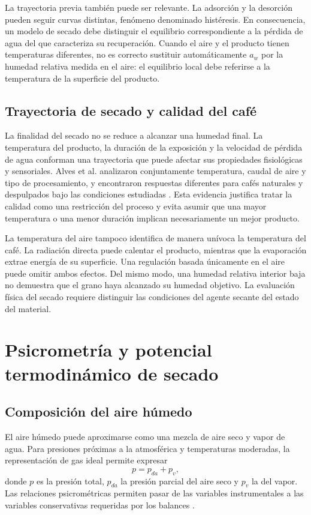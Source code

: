 La trayectoria previa también puede ser relevante. La adsorción y la desorción pueden seguir curvas distintas, fenómeno denominado histéresis. En consecuencia, un modelo de secado debe distinguir el equilibrio correspondiente a la pérdida de agua del que caracteriza su recuperación. Cuando el aire y el producto tienen temperaturas diferentes, no es correcto sustituir automáticamente $a_w$ por la humedad relativa medida en el aire: el equilibrio local debe referirse a la temperatura de la superficie del producto.

\subsection{Trayectoria de secado y calidad del café}

La finalidad del secado no se reduce a alcanzar una humedad final. La temperatura del producto, la duración de la exposición y la velocidad de pérdida de agua conforman una trayectoria que puede afectar sus propiedades fisiológicas y sensoriales. Alves et al. analizaron conjuntamente temperatura, caudal de aire y tipo de procesamiento, y encontraron respuestas diferentes para cafés naturales y despulpados bajo las condiciones estudiadas \cite{alves2017}. Esta evidencia justifica tratar la calidad como una restricción del proceso y evita asumir que una mayor temperatura o una menor duración implican necesariamente un mejor producto.

La temperatura del aire tampoco identifica de manera unívoca la temperatura del café. La radiación directa puede calentar el producto, mientras que la evaporación extrae energía de su superficie. Una regulación basada únicamente en el aire puede omitir ambos efectos. Del mismo modo, una humedad relativa interior baja no demuestra que el grano haya alcanzado su humedad objetivo. La evaluación física del secado requiere distinguir las condiciones del agente secante del estado del material.

\section{Psicrometría y potencial termodinámico de secado}
\label{sec:psicrometria}

\subsection{Composición del aire húmedo}

El aire húmedo puede aproximarse como una mezcla de aire seco y vapor de agua. Para presiones próximas a la atmosférica y temperaturas moderadas, la representación de gas ideal permite expresar
\begin{equation}
p=p_{da}+p_v,
\label{eq:dalton}
\end{equation}
donde $p$ es la presión total, $p_{da}$ la presión parcial del aire seco y $p_v$ la del vapor. Las relaciones psicrométricas permiten pasar de las variables instrumentales a las variables conservativas requeridas por los balances \cite{ashrae2021}.

